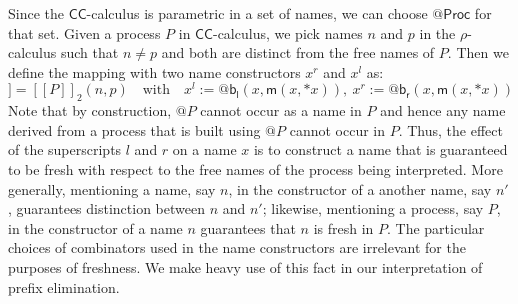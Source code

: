 \documentclass[submission,copyright,creativecommons]{eptcs}
\makeatletter
\newcommand{\ccomb}{$\mathsf{CC}$-calculus}
\newcommand{\ldb}{[\![}
\newcommand{\rdb}{]\!]}
\newcommand{\quotep}[1]{\mathsf{@}#1}
\newcommand{\meaningof}[1]{\ldb #1 \rdb}
\newcommand{\QProc}{\quotep{\mathsf{Proc}}}
\newcommand{\rhoc}{$\rho$-calculus}
\theoremstyle{definition}
\theoremstyle{remark}
\theoremstyle{remark}
\makeatother
\begin{document}
Since the {\ccomb} is parametric in a set of names, we can choose
$\QProc$ for that set.  Given a process $P$ in {\ccomb}, we pick names
$n$ and $p$ in the {\rhoc} such that $n \neq p$ and both are distinct
from the free names of $P$.  Then we define the mapping with two name
constructors $x^r$ and $x^l$ as:
\begin{equation*}
  \meaningof{P} = \meaningof{P}_2(n, p)
  \quad \mbox{with} \quad 
   x^l := \quotep{\mathsf{b}_{\mathsf{l}}(x,\mathsf{m}(x,*x))}, \ 
   x^r := \quotep{\mathsf{b}_{\mathsf{r}}(x,\mathsf{m}(x,*x))}
\end{equation*}
Note that by construction, $\quotep{P}$ cannot occur as a name in $P$
and hence any name derived from a process that is built using
$\quotep{P}$ cannot occur in $P$. Thus, the effect of the superscripts
$l$ and $r$ on a name $x$ is to construct a name that is guaranteed to
be fresh with respect to the free names of the process being
interpreted. More generally, mentioning a name, say $n$, in the
constructor of a another name, say $n'$, guarantees distinction
between $n$ and $n'$; likewise, mentioning a process, say $P$, in the
constructor of a name $n$ guarantees that $n$ is fresh in $P$. The
particular choices of combinators used in the name
constructors are irrelevant for the purposes of freshness. We
make heavy use of this fact in our interpretation of prefix
elimination.
\end{document}
